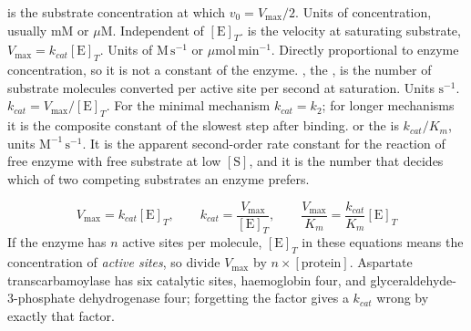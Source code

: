 \begin{defbox}[title={DEFINITIONS: the four kinetic parameters}]
 is the substrate concentration at which $v_0=V_{\max}/2$. Units of
concentration, usually $\mathrm{mM}$ or $\mu\mathrm{M}$. Independent of
$[\mathrm{E}]_T$.
 is the velocity at saturating substrate, $V_{\max}=k_{cat}[\mathrm{E}]_T$.
Units of $\mathrm{M\,s^{-1}}$ or $\mu\mathrm{mol\,min^{-1}}$. Directly proportional to
enzyme concentration, so it is not a constant of the enzyme.
, the , is the number of substrate molecules
converted per active site per second at saturation. Units $\mathrm{s^{-1}}$.
$k_{cat}=V_{\max}/[\mathrm{E}]_T$. For the minimal mechanism $k_{cat}=k_2$; for longer
mechanisms it is the composite constant of the slowest step after binding.
 or the  is $k_{cat}/K_m$, units
$\mathrm{M^{-1}\,s^{-1}}$. It is the apparent second-order rate constant for the
reaction of free enzyme with free substrate at low $[\mathrm{S}]$, and it is the
number that decides which of two competing substrates an enzyme prefers.
\end{defbox}

\begin{keybox}[title={MEMORIZE: the conversions between the four parameters}]
\[
V_{\max}=k_{cat}[\mathrm{E}]_T,\qquad
k_{cat}=\frac{V_{\max}}{[\mathrm{E}]_T},\qquad
\frac{V_{\max}}{K_m}=\frac{k_{cat}}{K_m}[\mathrm{E}]_T
\]
If the enzyme has $n$ active sites per molecule, $[\mathrm{E}]_T$ in these equations
means the concentration of \emph{active sites}, so divide $V_{\max}$ by
$n\times[\text{protein}]$. Aspartate transcarbamoylase has six catalytic sites,
haemoglobin four, and glyceraldehyde-3-phosphate dehydrogenase four; forgetting the
factor gives a $k_{cat}$ wrong by exactly that factor.
\end{keybox}

